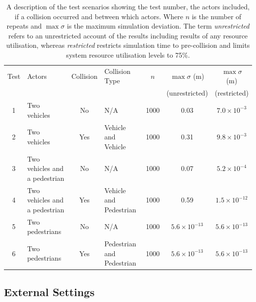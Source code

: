 \documentclass[letterpaper, 10 pt, journal, twoside]{IEEEtran}
\begin{document}
\begin{table}[b]
\centering
\begin{tabular}{clclccc}
\toprule
Test & Actors 					 	  & Collision 	 & Collision Type 			 & $n$  & $\max\sigma$ (m) & $\max\sigma$ (m) \\ 
	 & 								  & 			 & 							 &	    & (unrestricted)  & (restricted)	\\ \midrule
1    & Two vehicles                   & No  		 & N/A 			  			 & 1000 & 0.03 & $7.0{\times}10^{-3}$ \\
2    & Two vehicles                   & Yes 		 & Vehicle and Vehicle 		 & 1000 & 0.31 & $9.8{\times}10^{-3}$ \\
3    & Two vehicles and a pedestrian  & No  		 & N/A 			  			 & 1000 & 0.07 & $5.2{\times}10^{-4}$ \\
4    & Two vehicles and a pedestrian  & Yes 		 & Vehicle and Pedestrian 	 & 1000 & 0.59 & $1.5{\times}10^{-12}$ \\
5    & Two pedestrians                & No  		 & N/A 			  			 & 1000 & $5.6{\times}10^{-13}$ & $5.6{\times}10^{-13}$ \\
6    & Two pedestrians                & Yes 		 & Pedestrian and Pedestrian & 1000 & $5.6{\times}10^{-13}$ & $5.6{\times}10^{-13}$ \\
\bottomrule
\end{tabular}
\caption{A description of the test scenarios showing the test number, the actors included, if a collision occurred and between which actors. Where $n$ is the number of repeats and $\max\sigma$ is the maximum simulation deviation. The term \textit{unrestricted} refers to an unrestricted account of the results including results of any resource utilisation, whereas \textit{restricted} restricts simulation time to pre-collision and limits system resource utilisation levels to 75\%.}
\label{TableOfExperiments}
\end{table}

\subsection{External Settings}
\end{document}
